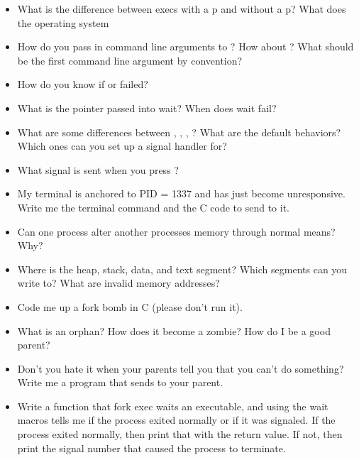 \begin{itemize}
\item
  What is the difference between execs with a p and without a p? What does the operating system
\item
  How do you pass in command line arguments to ? How about ? What should be the first command line argument by convention?
\item
  How do you know if  or  failed?
\item
  What is the  pointer passed into wait? When does wait fail?
\item
  What are some differences between , , , ? What are the default behaviors? Which ones can you set up a signal handler for?
\item
  What signal is sent when you press ?
\item
  My terminal is anchored to PID = 1337 and has just become unresponsive. Write me the terminal command and the C code to send  to it.
\item
  Can one process alter another processes memory through normal means? Why?
\item
  Where is the heap, stack, data, and text segment? Which segments can you write to? What are invalid memory addresses?
\item
  Code me up a fork bomb in C (please don't run it).
\item
  What is an orphan? How does it become a zombie? How do I be a good parent?
\item
  Don't you hate it when your parents tell you that you can't do something? Write me a program that sends  to your parent.
\item
  Write a function that fork exec waits an executable, and using the wait macros tells me if the process exited normally or if it was signaled. If the process exited normally, then print that with the return value. If not, then print the signal number that caused the process to terminate.
\end{itemize}



